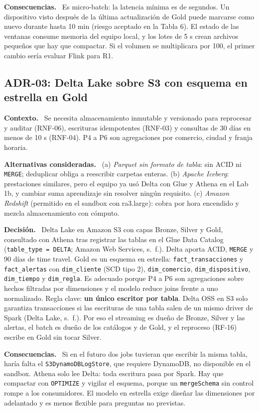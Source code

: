 \documentclass[12pt,letterpaper]{article}
\newcommand{\code}[1]{{\small\texttt{#1}}}
\newcommand{\adrpart}[1]{\textbf{#1.}~}
\begin{document}
\adrpart{Consecuencias} Es micro-batch: la latencia mínima es de segundos. Un dispositivo visto después de la última actualización de Gold puede marcarse como nuevo durante hasta 10 min (riesgo aceptado en la Tabla 6). El estado de las ventanas consume memoria del equipo local, y los lotes de 5 s crean archivos pequeños que hay que compactar. Si el volumen se multiplicara por 100, el primer cambio sería evaluar Flink para R1.

\subsection*{ADR-03: Delta Lake sobre S3 con esquema en estrella en Gold}

\adrpart{Contexto} Se necesita almacenamiento inmutable y versionado para reprocesar y auditar (RNF-06), escrituras idempotentes (RNF-03) y consultas de 30 días en menos de 10 s (RNF-04). P4 a P6 son agregaciones por comercio, ciudad y franja horaria.

\adrpart{Alternativas consideradas} (a) \emph{Parquet sin formato de tabla}: sin ACID ni \code{MERGE}; deduplicar obliga a reescribir carpetas enteras. (b) \emph{Apache Iceberg}: prestaciones similares, pero el equipo ya usó Delta con Glue y Athena en el Lab 1b, y cambiar suma aprendizaje sin resolver ningún requisito. (c) \emph{Amazon Redshift} (permitido en el sandbox con ra3.large): cobra por hora encendido y mezcla almacenamiento con cómputo.

\adrpart{Decisión} Delta Lake en Amazon S3 con capas Bronze, Silver y Gold, consultado con Athena tras registrar las tablas en el Glue Data Catalog (\code{table\_type = DELTA}; Amazon Web Services, s.~f.). Delta aporta ACID, \code{MERGE} y 90 días de time travel. Gold es un esquema en estrella: \code{fact\_transacciones} y \code{fact\_alertas} con \code{dim\_cliente} (SCD tipo 2), \code{dim\_comercio}, \code{dim\_dispositivo}, \code{dim\_tiempo} y \code{dim\_regla}. Es adecuado porque P4 a P6 son agregaciones sobre hechos filtradas por dimensiones y el modelo reduce joins frente a uno normalizado. Regla clave: \textbf{un único escritor por tabla}. Delta OSS en S3 solo garantiza transacciones si las escrituras de una tabla salen de un mismo driver de Spark (Delta Lake, s.~f.). Por eso el streaming es dueño de Bronze, Silver y las alertas, el batch es dueño de los catálogos y de Gold, y el reproceso (RF-16) escribe en Gold sin tocar Silver.

\adrpart{Consecuencias} Si en el futuro dos jobs tuvieran que escribir la misma tabla, haría falta el \code{S3DynamoDBLogStore}, que requiere DynamoDB, no disponible en el sandbox. Athena solo lee Delta: toda escritura pasa por Spark. Hay que compactar con \code{OPTIMIZE} y vigilar el esquema, porque un \code{mergeSchema} sin control rompe a los consumidores. El modelo en estrella exige diseñar las dimensiones por adelantado y es menos flexible para preguntas no previstas.
\end{document}
